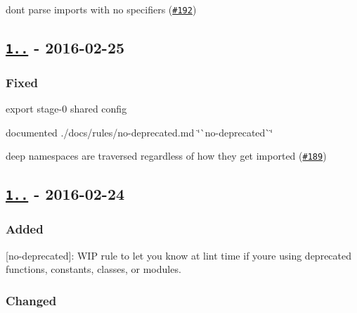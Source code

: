 \begin{DoxyItemize}
\item don\textquotesingle{}t parse imports with no specifiers (\href{https://github.com/benmosher/eslint-plugin-import/issues/192}{\tt \#192})
\end{DoxyItemize}

\subsection*{\href{https://github.com/benmosher/eslint-plugin-import/compare/v1.0.0...v1.0.1}{\tt 1..} -\/ 2016-\/02-\/25}

\subsubsection*{Fixed}


\begin{DoxyItemize}
\item export {\ttfamily stage-\/0} shared config
\item documented ./docs/rules/no-\/deprecated.md \char`\"{}\`{}no-\/deprecated\`{}\char`\"{}
\item deep namespaces are traversed regardless of how they get imported (\href{https://github.com/benmosher/eslint-plugin-import/issues/189}{\tt \#189})
\end{DoxyItemize}

\subsection*{\href{https://github.com/benmosher/eslint-plugin-import/compare/v1.0.0-beta.0...v1.0.0}{\tt 1..} -\/ 2016-\/02-\/24}

\subsubsection*{Added}


\begin{DoxyItemize}
\item \mbox{[}{\ttfamily no-\/deprecated}\mbox{]}\+: W\+IP rule to let you know at lint time if you\textquotesingle{}re using deprecated functions, constants, classes, or modules.
\end{DoxyItemize}

\subsubsection*{Changed}


